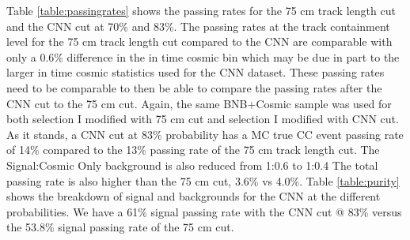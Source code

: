 \begin{table}[htp!]
\centering
{}
\caption{Signal and background event numbers at modified selection level with CNN cut estimated from a BNB+Cosmic sample and Cosmic only sample normalized to $5*10^{19}$ PoT. The last column gives the fraction of this signal or background type to the total selected events per CNN probability.} 
\label{table:purity} %
\end{table}

Table \ref{table:passingrates} shows the passing rates for the 75 cm track length cut and the CNN cut at 70\% and 83\%. The passing rates at the track containment level for the 75 cm track length cut compared to the CNN are comparable with only a 0.6\% difference in the in time cosmic bin which may be due in part to the larger in time cosmic statistics used for the CNN dataset. These passing rates need to be comparable to then be able to compare the passing rates after the CNN cut to the 75 cm cut. Again, the same BNB+Cosmic sample was used for both selection I modified with 75 cm cut and selection I modified with CNN cut. As it stands, a CNN cut at 83\% probability has a MC true CC event passing rate of 14\% compared to the 13\% passing rate of the 75 cm track length cut. The Signal:Cosmic Only background is also reduced from 1:0.6 to 1:0.4 The total passing rate is also higher than the 75 cm cut, 3.6\% vs 4.0\%. Table \ref{table:purity} shows the breakdown of signal and backgrounds for the CNN at the different probabilities. We have a 61\% signal passing rate with the CNN cut @ 83\% versus the 53.8\% signal passing rate of the 75 cm cut. 

